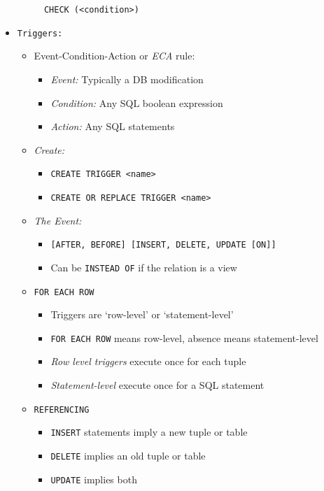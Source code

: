 \documentclass[landscape,8pt]{extarticle}
\newcommand{\code}{\lstinline}
\begin{document}
\begin{multicols}{4}
\begin{itemize}
\begin{itemize}
        \code{  CHECK (<condition>)}
    \end{itemize}
    \item \code{Triggers:}
    \begin{itemize}
        \item Event-Condition-Action or \emph{ECA} rule:
        \begin{itemize}
            \item \emph{Event:} Typically a DB modification
            \item \emph{Condition:} Any SQL boolean expression
            \item \emph{Action:} Any SQL statements
        \end{itemize}
        \item \emph{Create:}
        \begin{itemize}
            \item \code{CREATE TRIGGER <name>}
            \item \code{CREATE OR REPLACE TRIGGER <name>}
        \end{itemize}
        \item \emph{The Event:}
        \begin{itemize}
            \item \code{[AFTER, BEFORE] [INSERT, DELETE, UPDATE [ON]]}
            \item Can be \code{INSTEAD OF} if the relation is a view
        \end{itemize}
        \item \code{FOR EACH ROW}
        \begin{itemize}
            \item Triggers are `row-level' or `statement-level'
            \item \code{FOR EACH ROW} means row-level, absence means statement-level
            \item \emph{Row level triggers} execute once for each tuple
            \item \emph{Statement-level} execute once for a SQL statement
        \end{itemize}
        \item \code{REFERENCING}
        \begin{itemize}
            \item \code{INSERT} statements imply a new tuple or table
            \item \code{DELETE} implies an old tuple or table
            \item \code{UPDATE} implies both

\end{itemize}
\end{itemize}
\end{itemize}
\end{multicols}
\end{document}
